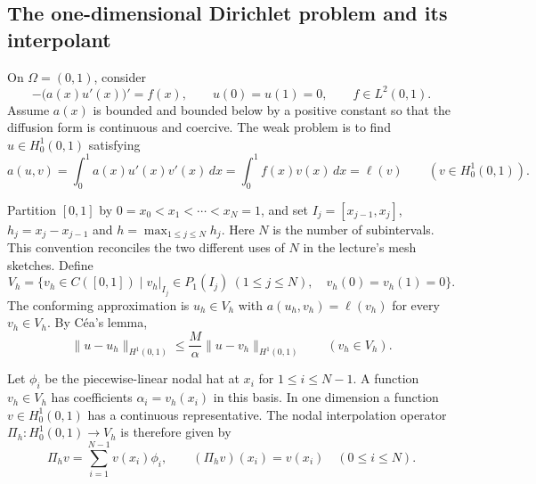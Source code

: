 \documentclass[11pt,a4paper]{article}
\begin{document}
\subsection{The one-dimensional Dirichlet problem and its interpolant}

On \(\Omega=(0,1)\), consider
\[
 -\bigl(a(x)u'(x)\bigr)'=f(x),\qquad u(0)=u(1)=0,\qquad
 f\in L^2(0,1).
\]
Assume \(a(x)\) is bounded and bounded below by a positive constant so that the diffusion form is continuous and coercive. The weak problem is to find \(u\in H_0^1(0,1)\) satisfying
\[
 a(u,v)=\int_0^1 a(x)u'(x)v'(x)\,dx
    =\int_0^1 f(x)v(x)\,dx=\ell(v)
   \qquad(v\in H_0^1(0,1)).
\]

Partition \([0,1]\) by \(0=x_0<x_1<\cdots<x_N=1\), and set \(I_j=[x_{j-1},x_j]\), \(h_j=x_j-x_{j-1}\) and \(h=\max_{1\leq j\leq N}h_j\). Here \(N\) is the number of subintervals. This convention reconciles the two different uses of \(N\) in the lecture's mesh sketches. Define
\[
 V_h=\{v_h\in C([0,1])\mid v_h|_{I_j}\in P_1(I_j)\
              (1\leq j\leq N),\quad v_h(0)=v_h(1)=0\}.
\]
The conforming approximation is \(u_h\in V_h\) with \(a(u_h,v_h)=\ell(v_h)\) for every \(v_h\in V_h\). By Céa's lemma,
\[
 \|u-u_h\|_{H^1(0,1)}\le \frac M\alpha\|u-v_h\|_{H^1(0,1)}
 \qquad(v_h\in V_h).
\]

Let \(\phi_i\) be the piecewise-linear nodal hat at \(x_i\) for \(1\leq i\leq N-1\). A function \(v_h\in V_h\) has coefficients \(\alpha_i=v_h(x_i)\) in this basis. In one dimension a function \(v\in H_0^1(0,1)\) has a continuous representative. The nodal interpolation operator \(\Pi_h:H_0^1(0,1)\to V_h\) is therefore given by
\[
 \Pi_h v=\sum_{i=1}^{N-1} v(x_i)\phi_i,\qquad
 (\Pi_h v)(x_i)=v(x_i)\quad(0\leq i\leq N).
\]

\begin{center}
\end{center}
\end{document}
